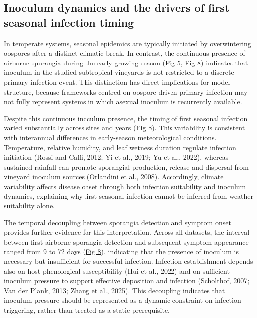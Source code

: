 \documentclass[
]{article}
\begin{document}
\subsection{Inoculum dynamics and the drivers of first seasonal
infection
timing}\label{inoculum-dynamics-and-the-drivers-of-first-seasonal-infection-timing}

In temperate systems, seasonal epidemics are typically initiated by
overwintering oospores after a distinct climatic break. In contrast, the
continuous presence of airborne sporangia during the early growing
season (\hyperref[_Ref214187767]{Fig 5}, \hyperref[_Ref212492136]{Fig
8}) indicates that inoculum in the studied subtropical vineyards is not
restricted to a discrete primary infection event. This distinction has
direct implications for model structure, because frameworks centred on
oospore-driven primary infection may not fully represent systems in
which asexual inoculum is recurrently available.

Despite this continuous inoculum presence, the timing of first seasonal
infection varied substantially across sites and years
(\hyperref[_Ref212492136]{Fig 8}). This variability is consistent with
interannual differences in early-season meteorological conditions.
Temperature, relative humidity, and leaf wetness duration regulate
infection initiation (Rossi and Caffi, 2012; Yi et al., 2019; Yu et
al., 2022), whereas sustained rainfall can promote sporangial
production, release and dispersal from vineyard inoculum sources
(Orlandini et al., 2008). Accordingly, climate variability affects
disease onset through both infection suitability and inoculum dynamics,
explaining why first seasonal infection cannot be inferred from weather
suitability alone.

The temporal decoupling between sporangia detection and symptom onset
provides further evidence for this interpretation. Across all datasets,
the interval between first airborne sporangia detection and subsequent
symptom appearance ranged from 9 to 72 days
(\hyperref[_Ref212492136]{Fig 8}), indicating that the presence of
inoculum is necessary but insufficient for successful infection.
Infection establishment depends also on host phenological susceptibility
(Hui et al., 2022) and on sufficient inoculum pressure to support
effective deposition and infection (Scholthof, 2007; Van der Plank,
2013; Zhang et al., 2025). This decoupling indicates that inoculum
pressure should be represented as a dynamic constraint on infection
triggering, rather than treated as a static prerequisite.
\end{document}

